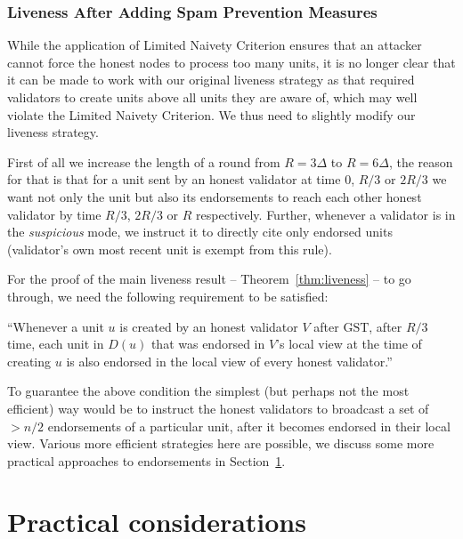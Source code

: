 \documentclass[12pt, fleqn]{article}
\newcommand{\gst}{\mathrm{GST}}
\begin{document}
\subsubsection{Liveness After Adding Spam Prevention Measures}\label{sec:dynamicrounds}

While the application of Limited Naivety Criterion ensures that an attacker cannot force the honest nodes to process too many units, it is no longer clear that it can be made to work with our original liveness strategy as that required validators to create units above all units they are aware of, which may well violate the Limited Naivety Criterion. We thus need to slightly modify our liveness strategy.

First of all we increase the length of a round from $R=3\Delta$ to $R=6\Delta$, the reason for that is that for a unit sent by an honest validator at time $0$, $R/3$ or $2R/3$ we want not only the unit but also its endorsements to reach each other honest validator by time $R/3$, $2R/3$ or $R$ respectively.
%
Further, whenever a validator is in the {\it suspicious} mode, we instruct it to directly cite only endorsed units (validator's own most recent unit is exempt from this rule).

For the proof of the main liveness result -- Theorem~\ref{thm:liveness} -- to go through, we need the following requirement to be satisfied: 

 ``Whenever a unit $u$ is created by an honest validator $V$ after $\gst$, after $R/3$ time, each unit in $D(u)$ that was endorsed in $V$'s local view at the time of creating $u$ is also endorsed in the local view of every honest validator.''

To guarantee the above condition the simplest (but perhaps not the most efficient) way would be to instruct the honest validators to broadcast a set of $>n/2$ endorsements of a particular unit, after it becomes endorsed in their local view.
%
Various more efficient strategies here are possible, we discuss some more practical approaches to endorsements in Section~\ref{sec:practical}.


\section{Practical considerations}\label{sec:practical}
\end{document}
